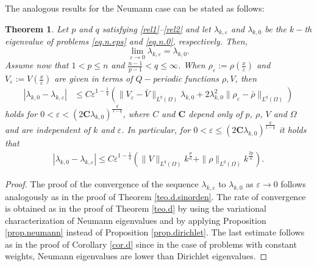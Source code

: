 \documentclass[12pt]{amsart}
\newtheorem{thm}{Theorem}[section]
\theoremstyle{definition}
\theoremstyle{remark}
\numberwithin{equation}{section}
\begin{document}
The analogous results for the Neumann case can be stated as follows:
\begin{thm} \label{teo.n}
Let $p$ and $q$ satisfying \eqref{rel1}--\eqref{rel2} and let $\lambda_{k,\varepsilon}$ and $\lambda_{k,0}$ be the $k-$th eigenvalue of problems \eqref{eq.n.eps} and \eqref{eq.n.0}, respectively. Then, 
$$
\lim_{\varepsilon\to 0} \lambda_{k,\varepsilon} = \lambda_{k,0}.
$$
Assume now that $1<p\leq n$ and $\frac{n-1}{p-1}<q\leq \infty$. When $\rho_\varepsilon:=\rho(\tfrac{x}{\varepsilon})$ and $V_\varepsilon:=V(\tfrac{x}{\varepsilon})$ are given in terms of $Q-$periodic functions $\rho,V$, then
\begin{align*}
|\lambda_{k,0}-\lambda_{k,\varepsilon}| &\leq  
C  \varepsilon^{1-\frac1q} \left( \|V_\varepsilon - \bar V\|_{L^q(\Omega)} \lambda_{k,0} +  2 \lambda_{k,0}^2 \|\rho_\varepsilon - \bar \rho\|_{L^q(\Omega)}   \right)
\end{align*}
holds for $0<\varepsilon< (2\textbf{C} \lambda_{k,0})^\frac{q}{1-q}$, where $C$   and $\textbf{C}$ depend only of $p$,   $\rho$, $V$ and $\Omega$ and are independent of $k$ and $\varepsilon$. In particular,   for $0<\varepsilon \leq (2\textbf{C} \lambda_{k,0})^\frac{q}{1-q}$ it holds that
\begin{align*}
|\lambda_{k,0}-\lambda_{k,\varepsilon}| \leq C \varepsilon^{1-\frac1q} \left( \|V \|_{L^q(\Omega)} k^\frac{p}{n} +     \|\rho \|_{L^q(\Omega)}   k^\frac{2p}{n} \right).
\end{align*}
\end{thm}

\begin{proof}
The proof of the convergence of the sequence $\lambda_{k,\varepsilon}$ to $\lambda_{k,0}$ as $\varepsilon\to 0$ follows analogously as in the proof of Theorem \ref{teo.d.sinorden}. The rate of convergence is obtained as in the proof of Theorem \ref{teo.d}   by using the variational characterization of Neumann eigenvalues and by applying  Proposition \ref{prop.neumann} instead of Proposition \ref{prop.dirichlet}. The last estimate follows as in the proof of Corollary \ref{cor.d} since in the case of problems with constant weights, Neumann eigenvalues  are lower than Dirichlet eigenvalues.
\end{proof}



 
\end{document}
